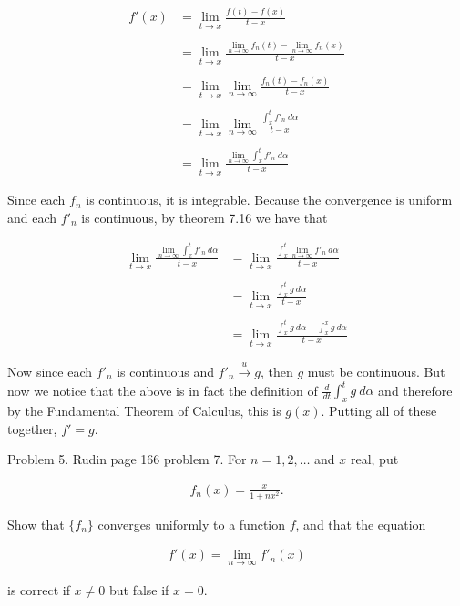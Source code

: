 \documentclass{article}
\begin{document}
  \begin{align*}
    f'(x) &= \lim_{t\to x}\frac{f(t)-f(x)}{t-x} \\\\
    &= \lim_{t\to x}\frac{\lim_{n\to \infty}f_n(t)-\lim_{n\to\infty} f_n(x)}{t-x} \\\\
    &= \lim_{t\to x}\lim_{n\to \infty}\frac{f_n(t)-f_n(x)}{t-x} \\\\
    &= \lim_{t\to x}\lim_{n\to \infty}\frac{\int_x^t f'_n \ d\alpha }{t-x} \\\\
    &= \lim_{t\to x}\frac{\lim_{n\to \infty}\int_x^t f'_n \ d\alpha }{t-x} 
  \end{align*}

  Since each $f_n$ is continuous, it is integrable.  Because the convergence is uniform and each $f'_n$ is continuous, by theorem 7.16 we have that 

  \begin{align*}
    \lim_{t\to x}\frac{\lim_{n\to \infty}\int_x^t f'_n \ d\alpha }{t-x} &= \lim_{t\to x}\frac{\int_x^t \lim_{n\to \infty}f'_n \ d\alpha }{t-x}\\\\
    &= \lim_{t\to x}\frac{\int_x^t g \ d\alpha }{t-x}\\\\
    &= \lim_{t\to x}\frac{\int_x^t g \ d\alpha - \int_x^x g\ d\alpha }{t-x}
  \end{align*}

  Now since each $f'_n$ is continuous and $f'_n\xrightarrow{u} g$, then $g$ must be continuous.  But now we notice that the above is in fact the definition of $\frac{d}{dt}\int_x^t g\ d\alpha$ and therefore by the Fundamental Theorem of Calculus, this is $g(x)$.  Putting all of these together, $f'=g$.

  \pagebreak

  {\Large \color{Sepia} Problem 5.  Rudin page 166 problem 7. For $n=1,2,\dots$ and $x$ real, put 
  
  \begin{align*}
    f_n(x) = \frac{x}{1+nx^2}.
  \end{align*}

  Show that $\{f_n\}$ converges uniformly to a function $f$, and that the equation 

  \begin{align*}
    f'(x)=\lim_{n\to \infty}f'_n(x)
  \end{align*}

  is correct if $x\ne 0$ but false if $x=0$.
  
  }
\end{document}
